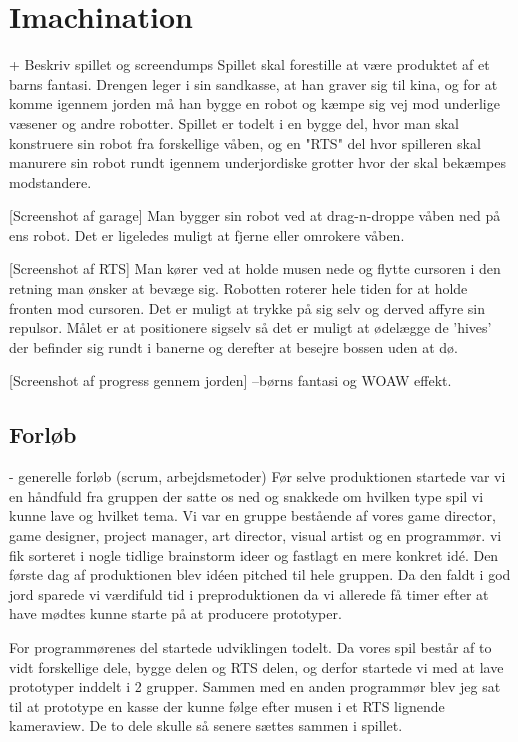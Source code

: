 \section{Imachination} + Beskriv spillet og screendumps Spillet skal
forestille at være produktet af et barns fantasi. Drengen leger i sin
sandkasse, at han graver sig til kina, og for at komme igennem jorden
må han bygge en robot og kæmpe sig vej mod underlige væsener og andre
robotter.  Spillet er todelt i en bygge del, hvor man skal konstruere
sin robot fra forskellige våben, og en "RTS" del hvor spilleren skal
manurere sin robot rundt igennem underjordiske grotter hvor der skal
bekæmpes modstandere.

[Screenshot af garage] Man bygger sin robot ved at drag-n-droppe våben
ned på ens robot. Det er ligeledes muligt at fjerne eller omrokere
våben.

[Screenshot af RTS] Man kører ved at holde musen nede og flytte
cursoren i den retning man ønsker at bevæge sig. Robotten roterer hele
tiden for at holde fronten mod cursoren. Det er muligt at trykke på
sig selv og derved affyre sin repulsor. Målet er at positionere
sigselv så det er muligt at ødelægge de 'hives' der befinder sig rundt
i banerne og derefter at besejre bossen uden at dø.

[Screenshot af progress gennem jorden] --børns fantasi og WOAW effekt.

\subsection{Forløb}

                - generelle forløb (scrum, arbejdsmetoder) Før selve
produktionen startede var vi en håndfuld fra gruppen der satte os ned
og snakkede om hvilken type spil vi kunne lave og hvilket tema. Vi var
en gruppe bestående af vores game director, game designer, project
manager, art director, visual artist og en programmør. vi fik sorteret
i nogle tidlige brainstorm ideer og fastlagt en mere konkret idé. Den
første dag af produktionen blev idéen pitched til hele gruppen. Da den
faldt i god jord sparede vi værdifuld tid i preproduktionen da vi
allerede få timer efter at have mødtes kunne starte på at producere
prototyper.

For programmørenes del startede udviklingen todelt. Da vores spil
består af to vidt forskellige dele, bygge delen og RTS delen, og
derfor startede vi med at lave prototyper inddelt i 2 grupper. Sammen
med en anden programmør blev jeg sat til at prototype en kasse der
kunne følge efter musen i et RTS lignende kameraview. De to dele
skulle så senere sættes sammen i spillet.

